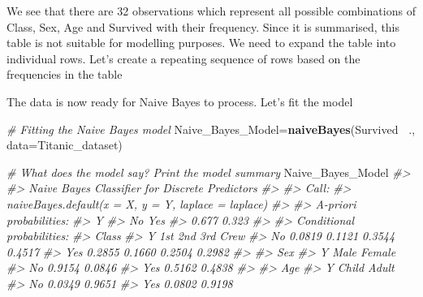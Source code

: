 \documentclass[]{book}
\newenvironment{Shaded}{\begin{snugshade}}{\end{snugshade}}
\newcommand{\CommentTok}[1]{\textcolor[rgb]{0.56,0.35,0.01}{\textit{#1}}}
\newcommand{\DataTypeTok}[1]{\textcolor[rgb]{0.13,0.29,0.53}{#1}}
\newcommand{\KeywordTok}[1]{\textcolor[rgb]{0.13,0.29,0.53}{\textbf{#1}}}
\newcommand{\NormalTok}[1]{#1}
\newcommand{\OperatorTok}[1]{\textcolor[rgb]{0.81,0.36,0.00}{\textbf{#1}}}
\newcommand{\OtherTok}[1]{\textcolor[rgb]{0.56,0.35,0.01}{#1}}
\begin{document}
We see that there are 32 observations which represent all possible combinations of Class, Sex, Age and Survived with their frequency. Since it is summarised, this table is not suitable for modelling purposes. We need to expand the table into individual rows. Let's create a repeating sequence of rows based on the frequencies in the table

\begin{Shaded}
\end{Shaded}

The data is now ready for Naive Bayes to process. Let's fit the model

\begin{Shaded}
\begin{Highlighting}[]
\CommentTok{# Fitting the Naive Bayes model}
\NormalTok{Naive_Bayes_Model=}\KeywordTok{naiveBayes}\NormalTok{(Survived }\OperatorTok{~}\NormalTok{., }\DataTypeTok{data=}\NormalTok{Titanic_dataset)}

\CommentTok{# What does the model say? Print the model summary}
\NormalTok{Naive_Bayes_Model}
\CommentTok{#> }
\CommentTok{#> Naive Bayes Classifier for Discrete Predictors}
\CommentTok{#> }
\CommentTok{#> Call:}
\CommentTok{#> naiveBayes.default(x = X, y = Y, laplace = laplace)}
\CommentTok{#> }
\CommentTok{#> A-priori probabilities:}
\CommentTok{#> Y}
\CommentTok{#>    No   Yes }
\CommentTok{#> 0.677 0.323 }
\CommentTok{#> }
\CommentTok{#> Conditional probabilities:}
\CommentTok{#>      Class}
\CommentTok{#> Y        1st    2nd    3rd   Crew}
\CommentTok{#>   No  0.0819 0.1121 0.3544 0.4517}
\CommentTok{#>   Yes 0.2855 0.1660 0.2504 0.2982}
\CommentTok{#> }
\CommentTok{#>      Sex}
\CommentTok{#> Y       Male Female}
\CommentTok{#>   No  0.9154 0.0846}
\CommentTok{#>   Yes 0.5162 0.4838}
\CommentTok{#> }
\CommentTok{#>      Age}
\CommentTok{#> Y      Child  Adult}
\CommentTok{#>   No  0.0349 0.9651}
\CommentTok{#>   Yes 0.0802 0.9198}
\end{Highlighting}
\end{Shaded}
\end{document}
